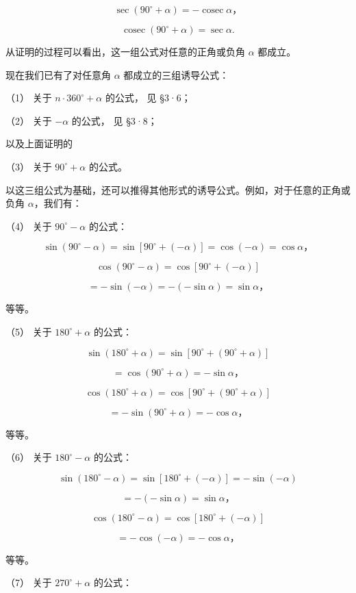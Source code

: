 \[
\sec(90^{\circ}+\alpha)=-\operatorname{cosec}\alpha \text{，}
\]

\[
\operatorname{cosec}(90^{\circ}+\alpha)=\sec\alpha .
\]

从证明的过程可以看出，这一组公式对任意的正角或负角 \(\alpha\) 都成立。

现在我们已有了对任意角 \(\alpha\) 都成立的三组诱导公式：

（1） 关于 \(n \cdot 360^{\circ} + \alpha\) 的公式， 见 §3·6；

（2） 关于 \(-\alpha\) 的公式， 见 §3·8；

以及上面证明的

（3） 关于 \(90^{\circ} + \alpha\) 的公式。

以这三组公式为基础，还可以推得其他形式的诱导公式。例如，对于任意的正角或负角
\(\alpha\)，我们有：

（4） 关于 \(90^{\circ} - \alpha\) 的公式：

\[
\sin (90 ^{\circ} - \alpha) = \sin [ 90 ^{\circ} + (- \alpha) ] = \cos (- \alpha) = \cos \alpha \text{，}
\]

\[
\cos (90 ^{\circ} - \alpha) = \cos [ 90 ^{\circ} + (- \alpha) ]
\]

\[
= - \sin (- \alpha) = - (- \sin \alpha) = \sin \alpha \text{，}
\]

等等。

（5） 关于 \(180^{\circ} + \alpha\) 的公式：

\[
\sin (180 ^{\circ} + \alpha) = \sin [ 90 ^{\circ} + (90 ^{\circ} + \alpha) ]
\]

\[
= \cos (90 ^{\circ} + \alpha) = - \sin \alpha \text{，}
\]

\[
\cos (180 ^{\circ} + \alpha) = \cos [ 90 ^{\circ} + (90 ^{\circ} + \alpha) ]
\]

\[
= - \sin (90 ^{\circ} + \alpha) = - \cos \alpha \text{，}
\]

等等。

（6） 关于 \(180^{\circ} - \alpha\) 的公式：

\[
\sin (180 ^{\circ} - \alpha) = \sin [ 180 ^{\circ} + (- \alpha) ] = - \sin (- \alpha)
\]

\[
= - (- \sin \alpha) = \sin \alpha \text{，}
\]

\[
\cos (180 ^{\circ} - \alpha) = \cos [ 180 ^{\circ} + (- \alpha) ]
\]

\[
= - \cos (- \alpha) = - \cos \alpha \text{，}
\]

等等。

（7） 关于 \(270^{\circ} + \alpha\) 的公式：

